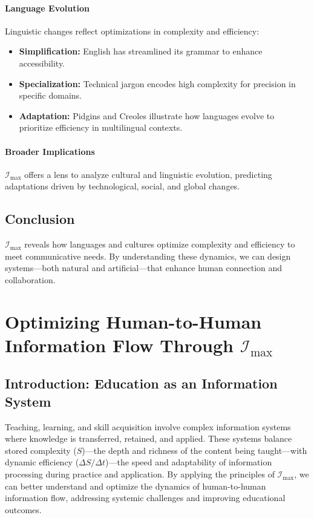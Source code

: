 \documentclass[12pt]{article}
\begin{document}
\paragraph{Language Evolution}
Linguistic changes reflect optimizations in complexity and efficiency:
\begin{itemize}
    \item \textbf{Simplification:} English has streamlined its grammar to enhance accessibility.
    \item \textbf{Specialization:} Technical jargon encodes high complexity for precision in specific domains.
    \item \textbf{Adaptation:} Pidgins and Creoles illustrate how languages evolve to prioritize efficiency in multilingual contexts.
\end{itemize}

\paragraph{Broader Implications}
\(\mathcal{I}_{\text{max}}\) offers a lens to analyze cultural and linguistic evolution, predicting adaptations driven by technological, social, and global changes.

\subsection{Conclusion}
\(\mathcal{I}_{\text{max}}\) reveals how languages and cultures optimize complexity and efficiency to meet communicative needs. By understanding these dynamics, we can design systems—both natural and artificial—that enhance human connection and collaboration.


\section{Optimizing Human-to-Human Information Flow Through \(\mathcal{I}_{\text{max}}\)}

\subsection{Introduction: Education as an Information System}
Teaching, learning, and skill acquisition involve complex information systems where knowledge is transferred, retained, and applied. These systems balance stored complexity (\( S \))—the depth and richness of the content being taught—with dynamic efficiency (\( \Delta S / \Delta t \))—the speed and adaptability of information processing during practice and application. By applying the principles of \(\mathcal{I}_{\text{max}}\), we can better understand and optimize the dynamics of human-to-human information flow, addressing systemic challenges and improving educational outcomes.
\end{document}
